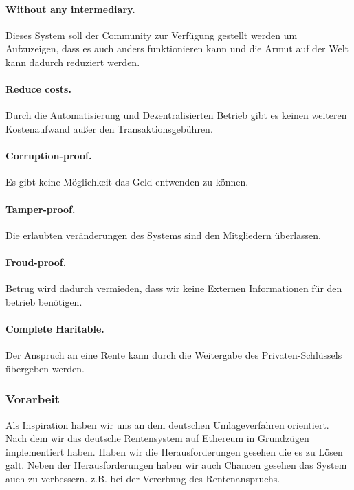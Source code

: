 \paragraph{Without any intermediary.} Dieses System soll der Community zur Verfügung gestellt werden um Aufzuzeigen, dass es auch anders funktionieren kann und die Armut auf der Welt kann dadurch reduziert werden.

\paragraph{Reduce costs.} Durch die Automatisierung und Dezentralisierten Betrieb gibt es keinen weiteren Kostenaufwand außer den Transaktionsgebühren.

\paragraph{Corruption-proof.} Es gibt keine Möglichkeit das Geld entwenden zu können.

\paragraph{Tamper-proof.} Die erlaubten veränderungen des Systems sind den Mitgliedern überlassen.

\paragraph{Froud-proof.}
Betrug wird dadurch vermieden, dass wir keine Externen Informationen für den betrieb benötigen. 

\paragraph{Complete Haritable.}
Der Anspruch an eine Rente kann durch die Weitergabe des Privaten-Schlüssels übergeben werden.


\subsubsection*{Vorarbeit}

Als Inspiration haben wir uns an dem deutschen Umlageverfahren orientiert. Nach dem wir das deutsche Rentensystem auf Ethereum in Grundzügen implementiert haben. Haben wir die Herausforderungen gesehen die es zu Lösen galt.
Neben der Herausforderungen haben wir auch Chancen gesehen das System auch zu verbessern. z.B. bei der Vererbung des Rentenanspruchs.
